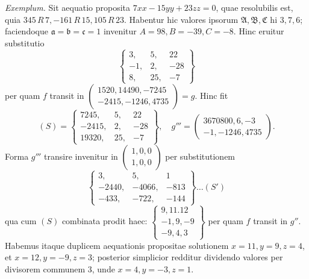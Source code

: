 \emph{Exemplum.} Sit aequatio proposita \(7xx-15yy+23zz=0\), quae resolubilis est, quia \(345\,R\,7,-161\,R\,15,105\,R\,23\). Habentur hic valores ipsorum \(\mathfrak A,\mathfrak B,\mathfrak C\) hi \(3,7,6\); faciendoque \(\mathfrak a=\mathfrak b=\mathfrak c=1\) invenitur \(A=98,B=-39,C=-8\). Hinc eruitur substitutio
\[
\left\{\begin{array}{rrr}3,&5,&22\\-1,&2,&-28\\8,&25,&-7\end{array}\right\}
\]
per quam \(f\) transit in \(\left(\begin{smallmatrix}1520,14490,-7245\\-2415,-1246,4735\end{smallmatrix}\right)=g\). Hinc fit
\[
(S)=\left\{\begin{array}{rrr}7245,&5,&22\\-2415,&2,&-28\\19320,&25,&-7\end{array}\right\},\quad
g'''=\left(\begin{smallmatrix}3670800,6,-3\\-1,-1246,4735\end{smallmatrix}\right).
\]
Forma \(g'''\) transire invenitur in \(\left(\begin{smallmatrix}1,0,0\\1,0,0\end{smallmatrix}\right)\) per substitutionem
\[
\left\{\begin{array}{rrr}3,&5,&1\\-2440,&-4066,&-813\\-433,&-722,&-144\end{array}\right\}\ldots(S')
\]
qua cum \((S)\) combinata prodit haec: \(\left\{\begin{smallmatrix}9,11.12\\-1,9,-9\\-9,4,3\end{smallmatrix}\right\}\) per quam \(f\) transit in \(g''\). Habemus itaque duplicem aequationis propositae solutionem \(x=11,y=9,z=4\), et \(x=12,y=-9,z=3\); posterior simplicior redditur dividendo valores per divisorem communem \(3\), unde \(x=4,y=-3,z=1\).

